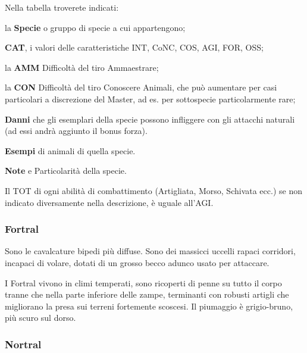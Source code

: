 Nella tabella troverete indicati:
\begin{description}
\item {la \textbf{Specie}} o gruppo di specie a cui appartengono;
\item {\textbf{CAT}}, i valori delle caratteristiche INT,
    CoNC, COS, AGI, FOR, OSS;
  
  \item {la \textbf{AMM}} Difficolt\`a del tiro Ammaestrare;
  \item{la \textbf{CON}} Difficolt\`a del tiro Conoscere Animali,
    che pu\`o aumentare per casi particolari a discrezione del
    Master, ad es. per sottospecie particolarmente rare;
  \item{\textbf{Danni}} che gli esemplari della specie possono
    infliggere con gli attacchi naturali (ad essi andr\`a aggiunto
    il bonus forza).
  \item{\textbf{Esempi}} di animali di quella specie.
  \item{\textbf{Note}} e Particolarit\`a della specie.

\end{description}

Il TOT di ogni abilit\`a di combattimento (Artigliata, Morso,
Schivata ecc.) se non indicato diversamente nella descrizione, \`e
uguale all'AGI. 


\subsubsection{Fortral}

Sono le cavalcature bipedi pi\`u diffuse. Sono dei massicci uccelli
rapaci corridori, incapaci di volare, dotati di un grosso becco adunco
usato per attaccare.

I Fortral vivono in climi temperati, sono ricoperti di penne su tutto
il corpo tranne che nella parte inferiore delle zampe, terminanti con
robusti artigli che migliorano la presa sui terreni fortemente
scoscesi. Il piumaggio \`e grigio-bruno, pi\`u scuro sul dorso.

\subsubsection{Nortral}

